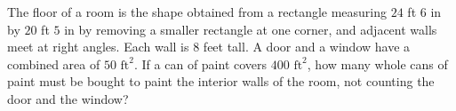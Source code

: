 The floor of a room is the shape obtained from a rectangle measuring $24$ ft $6$ in by $20$ ft $5$ in by removing a smaller rectangle at one corner, and adjacent walls meet at right angles. Each wall is $8$ feet tall. A door and a window have a combined area of $50\text{ ft}^2$. If a can of paint covers $400\text{ ft}^2$, how many whole cans of paint must be bought to paint the interior walls of the room, not counting the door and the window?
